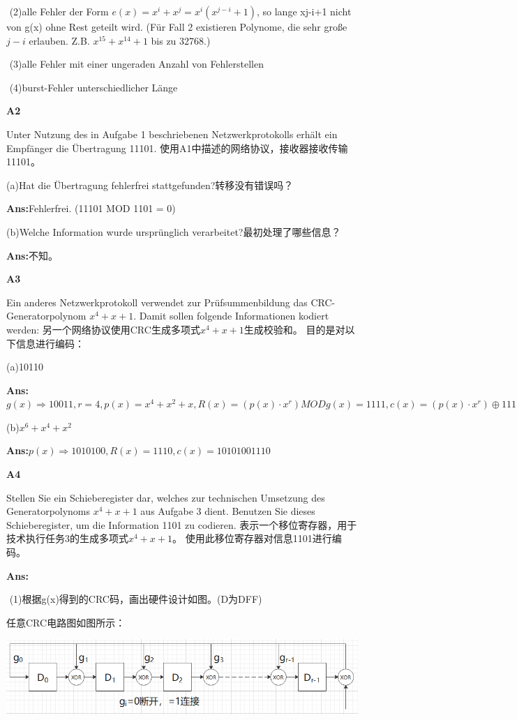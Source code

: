 \documentclass[fleqn]{article}
\begin{document}
\quad \quad \,\,(2)alle Fehler der Form $e(x) = x^i + x^j = x^i(x^{j-i}+1)$, so lange xj-i+1 nicht von g(x) ohne Rest geteilt wird.
(Für Fall 2 existieren Polynome, die sehr große $j-i$ erlauben. Z.B. $x^{15}+x^{14}+1$ bis zu 32768.)


\quad \quad \,\,(3)alle Fehler mit einer ungeraden Anzahl von Fehlerstellen

\quad \quad \,\,(4)burst-Fehler unterschiedlicher Länge


\noindent\textbf{A2}

Unter Nutzung des in Aufgabe 1 beschriebenen Netzwerkprotokolls erhält ein Empfänger die Übertragung 11101.
使用A1中描述的网络协议，接收器接收传输11101。

(a)Hat die Übertragung fehlerfrei stattgefunden?转移没有错误吗？

\textbf{Ans:}Fehlerfrei. (11101 MOD 1101 = 0)

(b)Welche Information wurde ursprünglich verarbeitet?最初处理了哪些信息？

\textbf{Ans:}不知。

\noindent\textbf{A3}

Ein anderes Netzwerkprotokoll verwendet zur Prüfsummenbildung das CRC-Generatorpolynom $x^4+x+1$. Damit sollen folgende Informationen kodiert werden:
另一个网络协议使用CRC生成多项式$ x ^ 4 + x + 1 $生成校验和。 目的是对以下信息进行编码：

(a)10110

\textbf{Ans:}$g(x)\Rightarrow 10011,r=4,p(x)=x^4+x^2+x,R(x)=(p(x)\cdot x^r)MOD g(x)=1111,c(x)=(p(x)\cdot x^r)\oplus 1111=101101111$

(b)$x^6+x^4+x^2$

\textbf{Ans:}$p(x)\Rightarrow 1010100,R(x)=1110,c(x)=10101001110$

\noindent\textbf{A4}

Stellen Sie ein Schieberegister dar, welches zur technischen Umsetzung des Generatorpolynoms $x^4+x+1$ aus Aufgabe 3 dient. Benutzen Sie dieses Schieberegister, um die Information 1101 zu codieren.
表示一个移位寄存器，用于技术执行任务3的生成多项式$ x ^ 4 + x + 1 $。 使用此移位寄存器对信息1101进行编码。

\textbf{Ans:}

\quad \quad \,\,(1)根据g(x)得到的CRC码，画出硬件设计如图。(D为DFF)

任意CRC电路图如图所示：
\begin{center}
    \includegraphics[scale=0.4]{bild13.png}
\end{center}
\end{document}

